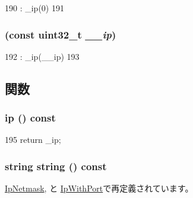 \begin{DoxyCode}
190                 : _ip(0)
191     {}
\end{DoxyCode}
\hypertarget{structNet_1_1IpAddress_ac64c29f95fc85f030281b767a3ba1815}{
\subsubsection[{IpAddress}]{ (const {\bf uint32\_\-t} {\em \_\-\_\-ip})}}
\label{structNet_1_1IpAddress_ac64c29f95fc85f030281b767a3ba1815}



\begin{DoxyCode}
192                                    : _ip(__ip)
193     {}
\end{DoxyCode}


\subsection{関数}
\hypertarget{structNet_1_1IpAddress_aa1d8477a72711a88f69e5fbac840c143}{
\subsubsection[{ip}]{ ip () const}}
\label{structNet_1_1IpAddress_aa1d8477a72711a88f69e5fbac840c143}



\begin{DoxyCode}
195 { return _ip; }
\end{DoxyCode}
\hypertarget{structNet_1_1IpAddress_a14a0e4fdb44bd7be64a3c6e5d94f8f0e}{
\subsubsection[{string}]{\setlength{\rightskip}{0pt plus 5cm}string string () const}}
\label{structNet_1_1IpAddress_a14a0e4fdb44bd7be64a3c6e5d94f8f0e}


\hyperlink{structNet_1_1IpNetmask_a14a0e4fdb44bd7be64a3c6e5d94f8f0e}{IpNetmask}, と \hyperlink{structNet_1_1IpWithPort_a14a0e4fdb44bd7be64a3c6e5d94f8f0e}{IpWithPort}で再定義されています。


